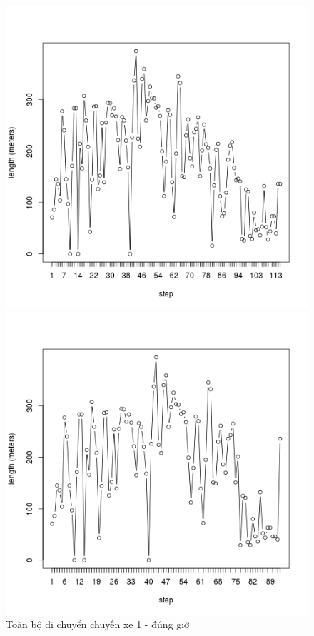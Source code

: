 \documentclass[a4paper, 13pt]{report}
\begin{document}
\FloatBarrier
\begin{figure}[!htb]
  \includegraphics[width=\linewidth]{test_100_1}
  \caption*{Toàn bộ di chuyển chuyến xe 1 - đúng giờ}
\endminipage
{}
  \includegraphics[width=\linewidth]{test_80_1}

\end{figure}
\end{document}
